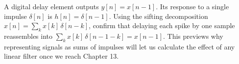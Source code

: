 \begin{exercise}
A digital delay element outputs $y[n] = x[n-1]$. Its response to a single impulse $\delta[n]$
is $h[n] = \delta[n-1]$. Using the sifting decomposition $x[n] = \sum_k x[k]\,\delta[n-k]$,
confirm that delaying each spike by one sample reassembles into $\sum_k x[k]\,\delta[n-1-k] = x[n-1]$.
This previews why representing signals as sums of impulses will let us calculate the effect
of any linear filter once we reach Chapter 13.
\end{exercise}
